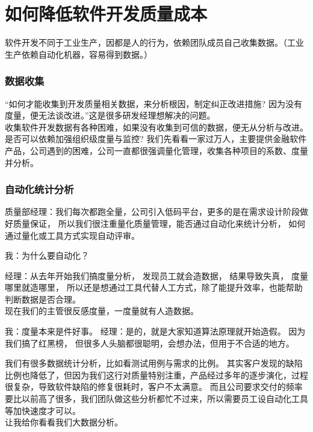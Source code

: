 \chapter{如何降低软件开发质量成本} %

软件开发不同于工业生产，因都是人的行为，依赖团队成员自己收集数据。（工业生产依赖自动化机器，容易得到数据。）

\hypertarget{ux6570ux636eux6536ux96c6}{%
\subsection{数据收集}\label{ux6570ux636eux6536ux96c6}}

``如何才能收集到开发质量相关数据，来分析根因，制定纠正改进措施?
因为没有度量，便无法谈改进。''这是很多研发经理想解决的问题。\\
收集软件开发数据有各种困难，如果没有收集到可信的数据，便无从分析与改进。\\
是否可以依赖加强组织级度量与监控?
我们先看看一家过万人，主要提供金融软件产品，公司遇到的困难，公司一直都很强调量化管理，收集各种项目的系数、度量并分析。\\

\hypertarget{ux81eaux52a8ux5316ux7edfux8ba1ux5206ux6790}{%
\subsection{自动化统计分析}\label{ux81eaux52a8ux5316ux7edfux8ba1ux5206ux6790}}

质量部经理：我们每次都跑全量，公司引入低码平台，更多的是在需求设计阶段做好质量保证，
所以我们很注重量化质量管理，能否通过自动化来统计分析，
如何通过量化或工具方式实现自动评审。

我：为什么要自动化？

经理：从去年开始我们搞度量分析， 发现员工就会造数据， 结果导致失真，
度量哪里就造哪里，
所以还是想通过工具代替人工方式，除了能提升效率，也能帮助判断数据是否合理。\\
现在我们的主管很反感度量，一度量就有人造数据。

我：度量本来是件好事。 经理：是的，就是大家知道算法原理就开始造假。
因为我们搞了红黑榜，
但很多人头脑都很聪明，会想办法，但用于不合适的地方。

我们有很多数据统计分析，比如看测试用例与需求的比例。
其实客户发现的缺陷比例也降低了，但因为我们这行对质量特别注重，产品经过多年的逐步演化，过程很复杂，导致软件缺陷的修复很耗时，客户不太满意。
而且公司要求交付的频率要比以前高了很多，我们团队做这些分析都忙不过来，所以需要员工设自动化工具等加快速度才可以。\\
让我给你看看我们大数据分析。

